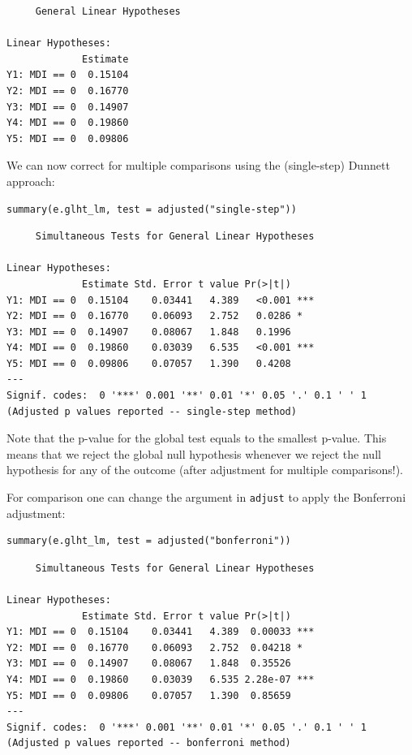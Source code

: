 \documentclass[12pt]{article}
\begin{document}
\begin{verbatim}
	 General Linear Hypotheses

Linear Hypotheses:
             Estimate
Y1: MDI == 0  0.15104
Y2: MDI == 0  0.16770
Y3: MDI == 0  0.14907
Y4: MDI == 0  0.19860
Y5: MDI == 0  0.09806
\end{verbatim}

We can now correct for multiple comparisons using the (single-step)
Dunnett approach:
\lstset{language=r,label= ,caption= ,captionpos=b,numbers=none}
\begin{lstlisting}
summary(e.glht_lm, test = adjusted("single-step"))
\end{lstlisting}

\begin{verbatim}
	 Simultaneous Tests for General Linear Hypotheses

Linear Hypotheses:
             Estimate Std. Error t value Pr(>|t|)    
Y1: MDI == 0  0.15104    0.03441   4.389   <0.001 ***
Y2: MDI == 0  0.16770    0.06093   2.752   0.0286 *  
Y3: MDI == 0  0.14907    0.08067   1.848   0.1996    
Y4: MDI == 0  0.19860    0.03039   6.535   <0.001 ***
Y5: MDI == 0  0.09806    0.07057   1.390   0.4208    
---
Signif. codes:  0 '***' 0.001 '**' 0.01 '*' 0.05 '.' 0.1 ' ' 1
(Adjusted p values reported -- single-step method)
\end{verbatim}

Note that the p-value for the global test equals to the smallest
 p-value. This means that we reject the global null hypothesis
 whenever we reject the null hypothesis for any of the outcome (after
 adjustment for multiple comparisons!).


For comparison one can change the argument in \texttt{adjust} to apply the
Bonferroni adjustment:
\lstset{language=r,label= ,caption= ,captionpos=b,numbers=none}
\begin{lstlisting}
summary(e.glht_lm, test = adjusted("bonferroni"))
\end{lstlisting}

\begin{verbatim}
	 Simultaneous Tests for General Linear Hypotheses

Linear Hypotheses:
             Estimate Std. Error t value Pr(>|t|)    
Y1: MDI == 0  0.15104    0.03441   4.389  0.00033 ***
Y2: MDI == 0  0.16770    0.06093   2.752  0.04218 *  
Y3: MDI == 0  0.14907    0.08067   1.848  0.35526    
Y4: MDI == 0  0.19860    0.03039   6.535 2.28e-07 ***
Y5: MDI == 0  0.09806    0.07057   1.390  0.85659    
---
Signif. codes:  0 '***' 0.001 '**' 0.01 '*' 0.05 '.' 0.1 ' ' 1
(Adjusted p values reported -- bonferroni method)
\end{verbatim}
\end{document}
